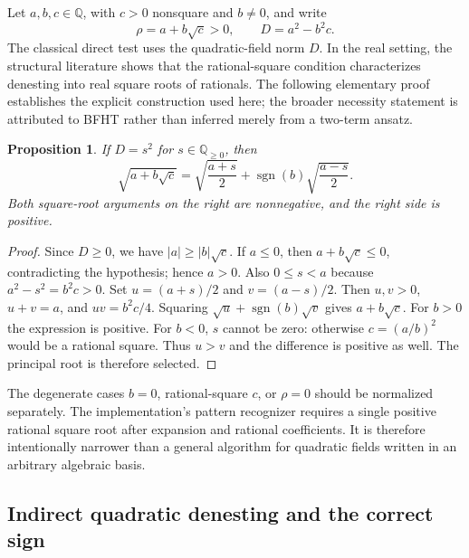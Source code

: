 \documentclass[11pt,letterpaper]{article}
\newcommand{\Q}{\mathbb{Q}}
\DeclareMathOperator{\sgn}{sgn}
\newtheorem{proposition}[theorem]{Proposition}
\theoremstyle{definition}
\theoremstyle{remark}
\begin{document}
Let $a,b,c\in\Q$, with $c>0$ nonsquare and $b\ne0$, and write
\[
 \rho=a+b\sqrt c>0,\qquad D=a^2-b^2c.
\]
The classical direct test uses the quadratic-field norm $D$. In the real setting, the structural literature shows that the rational-square condition characterizes denesting into real square roots of rationals. The following elementary proof establishes the explicit construction used here; the broader necessity statement is attributed to BFHT rather than inferred merely from a two-term ansatz.\cite{bfht,gkioulekas}

\begin{proposition}\label{prop:direct}
If $D=s^2$ for $s\in\Q_{\ge0}$, then
\begin{equation}\label{eq:direct}
 \sqrt{a+b\sqrt c}
 =\sqrt{\frac{a+s}{2}}+\sgn(b)\sqrt{\frac{a-s}{2}}.
\end{equation}
Both square-root arguments on the right are nonnegative, and the right side is positive.
\end{proposition}
\begin{proof}
Since $D\ge0$, we have $|a|\ge|b|\sqrt c$. If $a\le0$, then $a+b\sqrt c\le0$, contradicting the hypothesis; hence $a>0$. Also $0\le s<a$ because $a^2-s^2=b^2c>0$. Set $u=(a+s)/2$ and $v=(a-s)/2$. Then $u,v>0$, $u+v=a$, and $uv=b^2c/4$. Squaring $\sqrt u+\sgn(b)\sqrt v$ gives $a+b\sqrt c$. For $b>0$ the expression is positive. For $b<0$, $s$ cannot be zero: otherwise $c=(a/b)^2$ would be a rational square. Thus $u>v$ and the difference is positive as well. The principal root is therefore selected.
\end{proof}

The degenerate cases $b=0$, rational-square $c$, or $\rho=0$ should be normalized separately. The implementation's pattern recognizer requires a single positive rational square root after expansion and rational coefficients. It is therefore intentionally narrower than a general algorithm for quadratic fields written in an arbitrary algebraic basis.

\subsection{Indirect quadratic denesting and the correct sign}
\end{document}
